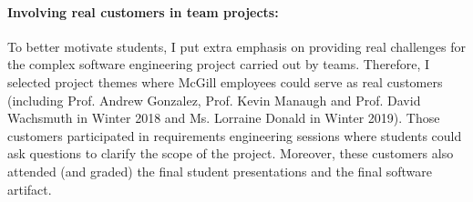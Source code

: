 


\paragraph{Involving real customers in team projects:}

To better motivate students, I put extra emphasis on providing real challenges for the complex software engineering project carried out by teams. Therefore, I selected project themes where McGill employees could serve as real customers (including Prof. Andrew Gonzalez, Prof. Kevin Manaugh and Prof. David Wachsmuth in Winter 2018 and Ms. Lorraine Donald in Winter 2019). Those customers participated in requirements engineering sessions where students could ask questions to clarify the scope of the project. Moreover, these customers also attended (and graded) the final student presentations and the final software artifact.

